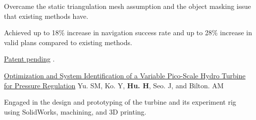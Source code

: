 \begin{cventries}
{\begin{cvitems}
      \item {Overcame the static triangulation mesh assumption and the object masking issue that existing methods have.
      }
      \item {Achieved up to 18\% increase in navigation success rate and up to 28\% increase in valid plans compared to existing methods.}
      \item \href{https://patents.google.com/patent/US20220135068A1/en}{Patent pending} .
    \end{cvitems}
    }
  \cvpublicationentrysimple
    {\href{https://asmedigitalcollection.asme.org/POWER/proceedings-abstract/POWER2020/83747/V001T08A020/1088386}{Optimization and System Identification of a Variable Pico-Scale Hydro Turbine for Pressure Regulation}} %
    {Yu. SM, Ko. Y, \textbf{Hu. H}, Seo. J, and Bilton. AM \hspace*{0pt}\hfill {}} %
    {
    \begin{cvitems}
      \item Engaged in the design and prototyping of the turbine and its experiment rig using SolidWorks, machining, and 3D printing.
    \end{cvitems}
    }
\end{cventries}








